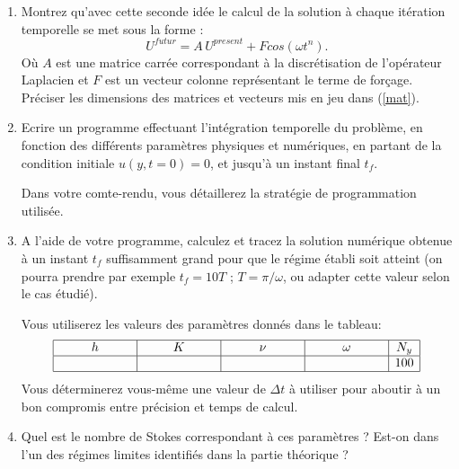 \documentclass[a4,12pt]{article}
\begin{document}
\begin{enumerate}
\item Montrez qu'avec cette seconde idée le calcul de la solution à chaque itération temporelle se met sous la forme :
\begin{equation}
\label{mat}
U^{futur} =A\, U^{present} +F cos(\omega t^{n}).
\end{equation}
\noindent
Où $A$ est une matrice carrée correspondant 
\`a la discr\'etisation de l'op\'erateur Laplacien et $F$ est un vecteur colonne 
repr\'esentant le terme de for\c{c}age. Pr\'eciser les dimensions des
matrices et vecteurs mis en jeu dans (\ref{mat}). 

\item Ecrire un programme effectuant l'intégration temporelle du problème,
en fonction des différents paramètres physiques et numériques,
en partant de la condition initiale $u(y,t=0) = 0$, et jusqu'à un instant final $t_f$.

Dans votre comte-rendu, vous détaillerez la stratégie de programmation utilisée.

\item A l'aide de votre programme, calculez et tracez la solution numérique obtenue 
à un instant $t_f$ suffisamment grand pour que le régime établi soit atteint (on pourra prendre par exemple $t_f = 10 T$ ; $T =\pi / \omega$,  ou adapter cette valeur selon le cas étudié).

Vous utiliserez les valeurs des paramètres donnés dans le tableau:
$$
\begin{array}{|c|c|c|c|c|}
\hline
h & K & \nu & \omega & N_y \\
\hline
\hspace{2cm} & \hspace{2cm} & \hspace{2cm} & \hspace{2cm} & 100 \\
\hline
\end{array}
$$
Vous déterminerez vous-même une valeur de $\Delta t$ à utiliser pour aboutir
à un bon compromis entre précision et temps de calcul.

\item Quel est le nombre de Stokes correspondant à ces paramètres ? Est-on dans l'un des régimes limites identifiés dans la partie théorique ?



\end{enumerate}
\end{document}
